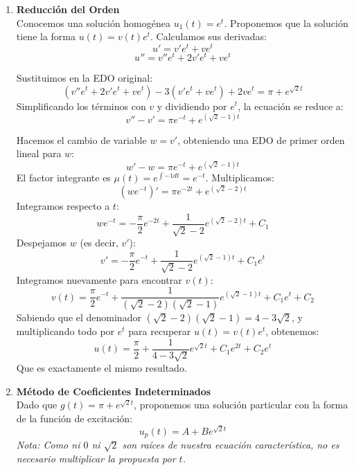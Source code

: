 {\begin{enumerate} [label=\alph*)]
            Construimos la solución particular $u_p(t) = v_1 u_1 + v_2 u_2$:
            $$u_p(t) = \left( \pi e^{-t} - \frac{1}{\sqrt{2}-1} e^{(\sqrt{2}-1)t} \right) e^t + \left( -\frac{\pi}{2} e^{-2t} + \frac{1}{\sqrt{2}-2} e^{(\sqrt{2}-2)t} \right) e^{2t}$$
            $$u_p(t) = \pi - \frac{1}{\sqrt{2}-1} e^{\sqrt{2}t} - \frac{\pi}{2} + \frac{1}{\sqrt{2}-2} e^{\sqrt{2}t}$$
            Agrupando términos, obtenemos:
            $$u_p(t) = \frac{\pi}{2} + \left( \frac{1}{\sqrt{2}-2} - \frac{1}{\sqrt{2}-1} \right) e^{\sqrt{2}t}$$

            Simplificamos el coeficiente de la exponencial buscando denominador común:
            $$\frac{1}{\sqrt{2}-2} - \frac{1}{\sqrt{2}-1} = \frac{(\sqrt{2}-1) - (\sqrt{2}-2)}{(\sqrt{2}-2)(\sqrt{2}-1)} = \frac{1}{4 - 3\sqrt{2}}$$
            Por lo tanto, la solución general $u(t) = u_h(t) + u_p(t)$ es:
            $$u(t) = C_1 e^t + C_2 e^{2t} + \frac{\pi}{2} + \frac{1}{4 - 3\sqrt{2}} e^{\sqrt{2}t}$$  
        \item \textbf{Reducción del Orden} \\
            Conocemos una solución homogénea $u_1(t) = e^t$. Proponemos que la solución tiene la forma $u(t) = v(t) e^t$.
            Calculamos sus derivadas:
            $$u' = v'e^t + ve^t$$
            $$u'' = v''e^t + 2v'e^t + ve^t$$

            Sustituimos en la EDO original:
            $$(v''e^t + 2v'e^t + ve^t) - 3(v'e^t + ve^t) + 2ve^t = \pi + e^{\sqrt{2}t}$$
            Simplificando los términos con $v$ y dividiendo por $e^t$, la ecuación se reduce a:
            $$v'' - v' = \pi e^{-t} + e^{(\sqrt{2}-1)t}$$

            Hacemos el cambio de variable $w = v'$, obteniendo una EDO de primer orden lineal para $w$:
            $$w' - w = \pi e^{-t} + e^{(\sqrt{2}-1)t}$$
            El factor integrante es $\mu(t) = e^{\int -1 dt} = e^{-t}$. Multiplicamos:
            $$(w e^{-t})' = \pi e^{-2t} + e^{(\sqrt{2}-2)t}$$
            Integramos respecto a $t$:
            $$w e^{-t} = -\frac{\pi}{2} e^{-2t} + \frac{1}{\sqrt{2}-2} e^{(\sqrt{2}-2)t} + C_1$$
            Despejamos $w$ (es decir, $v'$):
            $$v' = -\frac{\pi}{2} e^{-t} + \frac{1}{\sqrt{2}-2} e^{(\sqrt{2}-1)t} + C_1 e^t$$
            Integramos nuevamente para encontrar $v(t)$:
            $$v(t) = \frac{\pi}{2} e^{-t} + \frac{1}{(\sqrt{2}-2)(\sqrt{2}-1)} e^{(\sqrt{2}-1)t} + C_1 e^t + C_2$$
            Sabiendo que el denominador $(\sqrt{2}-2)(\sqrt{2}-1) = 4 - 3\sqrt{2}$, y multiplicando todo por $e^t$ para recuperar $u(t) = v(t)e^t$, obtenemos:
            $$u(t) = \frac{\pi}{2} + \frac{1}{4 - 3\sqrt{2}} e^{\sqrt{2}t} + C_1 e^{2t} + C_2 e^t$$
            Que es exactamente el mismo resultado.        
        \item \textbf{Método de Coeficientes Indeterminados} \\
            Dado que $g(t) = \pi + e^{\sqrt{2}t}$, proponemos una solución particular con la forma de la función de excitación:
            $$u_p(t) = A + B e^{\sqrt{2}t}$$
            \textit{Nota: Como ni $0$ ni $\sqrt{2}$ son raíces de nuestra ecuación característica, no es necesario multiplicar la propuesta por $t$.}


\end{enumerate}}
